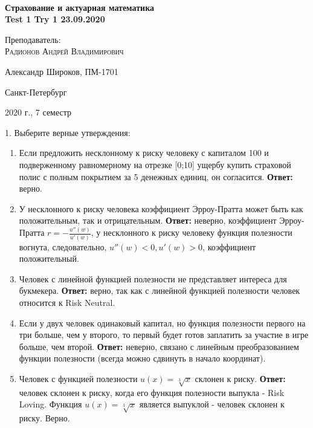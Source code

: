 \documentclass[%
12pt, %
final, %
oneside, %
onecolumn, %
centertags]{article} %
\theoremstyle{plain}
\theoremstyle{definition}
\theoremstyle{remark}
\begin{document}
\begin{titlepage} 
\begin{center}
\textbf{}\\[10.0cm]
\textbf{\LARGE Страхование и актуарная математика}\\[0.5cm]
\textbf{\Large Test 1 Try 1 23.09.2020} \\[0.2cm]


\begin{center} \large
{Преподаватель:} \\[0.5cm]
\textsc {Радионов Андрей Владимирович}\\
\end{center}

\vfill 



{\large {Александр Широков, ПМ-1701}} \par
{\large {Санкт-Петербург}} \par
{\large {2020 г., 7 семестр}} 

\end{center} 
\end{titlepage}

\newpage

1. Выберите верные утверждения:

\begin{enumerate}
	\item Если предложить несклонному к риску человеку с капиталом 100 и подверженному равномерному на отрезке [0;10] ущербу купить страховой полис с полным покрытием за 5 денежных единиц, он согласится. \textbf{Ответ:} верно.
	\item У несклонного к риску человека коэффициент Эрроу-Пратта может быть как
положительным, так и отрицательным. \textbf{Ответ:} неверно, коэффициент Эрроу-Пратта $r = -\frac{u''(w)}{u'(w)}$, у несклонного к риску человеку функция полезности вогнута, следовательно, $u''(w) <0, u'(w) > 0$, коэффициент положительный.
	\item Человек с линейной функцией полезности не представляет интереса для букмекера. \textbf{Ответ:} верно, так как с линейной функцией полезности человек относится к Risk Neutral.
	\item Если у двух человек одинаковый капитал, но функция полезности первого на три больше, чем у второго, то первый будет готов заплатить за участие в игре больше, чем второй. \textbf{Ответ:} неверно, связано с линейным преобразованием функции полезности (всегда можно сдвинуть в начало координат).
	\item Человек с функцией полезности $u(x) = \sqrt[3]{x}$ склонен к риску. \textbf{Ответ:} человек склонен к риску, когда его функция полезности выпукла - Risk Loving. Функция $u(x) = \sqrt[3]{x}$ является выпуклой - человек склонен к риску. Верно.
\end{enumerate}
\end{document}
